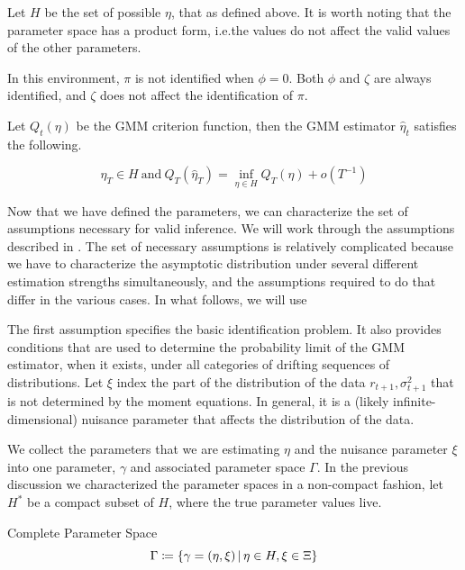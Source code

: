 \documentclass[11pt]{article}
\newcommand*{\Eta}{H}
\newcommand{\mvert}[1][\middle]{\ensuremath{\,#1\vert\,}}
\begin{document}
Let $\Eta$ be the set of possible $\eta$, that as defined above.
It is worth noting that the parameter space has a product form, i.e.\@ the values do not affect the valid values
of the other parameters.

In this environment, $\pi$ is not identified when $\phi = 0$.
Both $\phi$ and $\zeta$ are always identified, and $\zeta$ does not affect the identification of $\pi$.

Let $Q_t(\eta)$ be the GMM criterion function, then the GMM estimator $\hat{\eta}_t$ satisfies the following.


\begin{equation}
    \hat{\eta}_T \in \Eta\ \text{and}\ Q_T(\hat{\eta}_T) = \inf_{\eta \in \Eta} Q_T(\eta) +
    o\left(T^{-1}\right) 
\end{equation}


Now that we have defined the parameters, we can characterize the set of assumptions necessary for valid inference.
We will work through the assumptions described in \textcite{andrewsGmm2014}.
The set of necessary assumptions is relatively complicated because we have to characterize the asymptotic
distribution under several different estimation strengths simultaneously, and the assumptions required to do that
  differ in the various cases. 
In what follows, we will use 

The first assumption specifies the basic identification
problem. It also provides conditions that are used to determine the
probability limit of the GMM estimator, when it exists, under all categories
of drifting sequences of distributions.
Let $\xi$ index the part of the distribution of the data $r_{t+1}, \sigma^2_{t+1}$ that is not determined by the
moment equations.
In general, it is a (likely infinite-dimensional) nuisance parameter that affects the distribution of the data. 


We collect the parameters that we are estimating $\eta$ and the nuisance parameter $\xi$ into one parameter,
$\gamma$ and associated parameter space $\Gamma$.
In the previous discussion we characterized the parameter spaces in a non-compact fashion, let $\Eta^{*}$ be a
compact subset of $\Eta$, where the true parameter values live.

\begin{defn}{Complete Parameter Space}
    \begin{equation}
        \Gamma \coloneqq \left\lbrace \gamma = (\eta, \xi) \mvert \eta \in \Eta, \xi \in \Xi \right\rbrace 
    \end{equation}
\end{defn}
\end{document}
